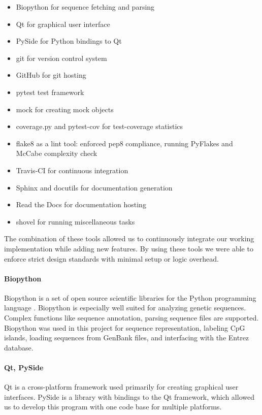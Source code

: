 \documentclass{bioinfo}
\begin{document}
\begin{itemize}
\item Biopython for sequence fetching and parsing
\item Qt for graphical user interface
\item PySide for Python bindings to Qt
\item git for version control system
\item GitHub for git hosting
\item pytest test framework
\item mock for creating mock objects
\item coverage.py and pytest-cov for test-coverage statistics
\item flake8 as a lint tool: enforced pep8 compliance, running PyFlakes and McCabe complexity check
\item Travis-CI for continuous integration
\item Sphinx and docutils for documentation generation
\item Read the Docs for documentation hosting
\item shovel for running miscellaneous tasks
\end{itemize}

The combination of these tools allowed us to continuously integrate our working implementation while adding new features. By using these tools we were able to enforce strict design standards with minimal setup or logic overhead.

\paragraph{Biopython\textcolon}
      Biopython is a set of open source scientific libraries for the Python programming language \citep{pmid19304878}. Biopython is especially well suited for analyzing genetic sequences. Complex functions like sequence annotation, parsing sequence files are supported. Biopython was used in this project for sequence representation, labeling CpG islands, loading sequences from GenBank files, and interfacing with the Entrez database.\\
    
\paragraph{Qt, PySide\textcolon}
Qt is a cross-platform framework used primarily for creating graphical user interfaces. PySide is a library with bindings to the Qt framework, which allowed us to develop this program with one code base for multiple platforms.
\end{document}
